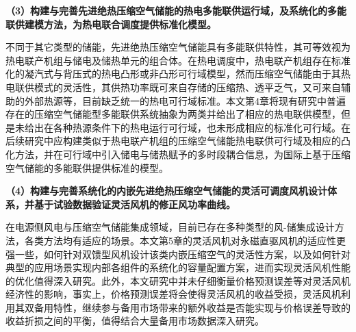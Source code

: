 \textbf{（3）构建与完善先进绝热压缩空气储能的热电多能联供运行域，及系统化的多能联供建模方法，为热电联合调度提供标准化模型。}

不同于其它类型的储能，先进绝热压缩空气储能具有多能联供特性，其可等效视为热电联产机组与储电及储热单元的组合体。在热电调度中，热电联产机组存在标准化的凝汽式与背压式的热电凸形或非凸形可行域模型，然而压缩空气储能由于其热电联供模式的灵活性，其供热功率既可来自存储的压缩热、透平乏气，又可来自辅助的外部热源等，目前缺乏统一的热电可行域标准。本文第4章将现有研究中普遍存在的压缩空气储能型多能联供系统抽象为两类并给出了相应的热电联供模型，但是未给出在各种热源条件下的热电运行可行域，也未形成相应的标准化可行域。在后续研究中应构建类似于热电联产机组的压缩空气储能热电联供可行域及相应的凸化方法，并在可行域中引入储电与储热赋予的多时段耦合信息，为国际上基于压缩空气储能的多能联供提供标准的模型。


\textbf{（4）构建与完善系统化的内嵌先进绝热压缩空气储能的灵活可调度风机设计体系，并基于试验数据验证灵活风机的修正风功率曲线。}

在电源侧风电与压缩空气储能集成领域，目前已存在多种类型的风-储集成设计方法，各类方法均有适应的场景。本文第5章的灵活风机对永磁直驱风机的适应性更强一些，如何针对双馈型风机设计该类内嵌压缩空气的灵活性方案，以及如何针对典型的应用场景实现内部各组件的系统化的容量配置方案，进而实现灵活风机性能的优化值得深入研究。此外，本文研究中并未仔细衡量价格预测误差等对灵活风机经济性的影响，事实上，价格预测误差将会使得灵活风机的收益受损，灵活风机利用其双备用特性，继续参与备用市场带来的额外收益是否能实现与价格误差导致的收益折损之间的平衡，值得结合大量备用市场数据深入研究。
